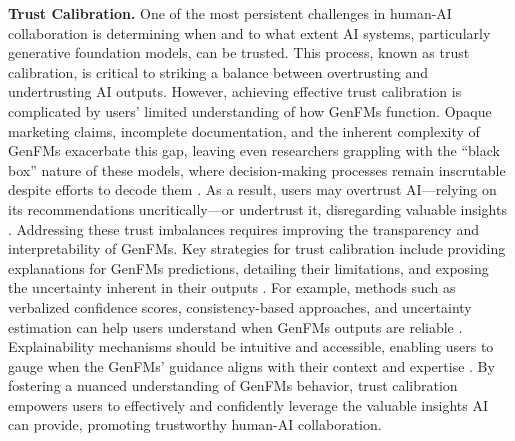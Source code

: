 \textbf{Trust Calibration.}
One of the most persistent challenges in human-AI collaboration is determining when and to what extent AI systems, particularly generative foundation models, can be trusted. This process, known as trust calibration, is critical to striking a balance between overtrusting and undertrusting AI outputs. However, achieving effective trust calibration is complicated by users' limited understanding of how GenFMs function. Opaque marketing claims, incomplete documentation, and the inherent complexity of GenFMs exacerbate this gap, leaving even researchers grappling with the ``black box'' nature of these models, where decision-making processes remain inscrutable despite efforts to decode them \cite{chen2024inside, bhardwaj-etal-2024-language, slobodkin-etal-2023-curious}. As a result, users may overtrust AI—relying on its recommendations uncritically—or undertrust it, disregarding valuable insights \cite{bs14080671, 10.1145/3544548.3581025, Elshan2022}. Addressing these trust imbalances requires improving the transparency and interpretability of GenFMs. Key strategies for trust calibration include providing explanations for GenFMs predictions, detailing their limitations, and exposing the uncertainty inherent in their outputs \cite{cheng2024can, shi-etal-2024-safer, brahman2024the, zhang2024rtuninginstructinglargelanguage}. For example, methods such as verbalized confidence scores, consistency-based approaches, and uncertainty estimation can help users understand when GenFMs outputs are reliable \cite{lin2022teaching, tian-etal-2023-just, zhao-etal-2024-knowing, wang2023selfconsistency}. Explainability mechanisms should be intuitive and accessible, enabling users to gauge when the GenFMs' guidance aligns with their context and expertise \cite{Mitchell_2019, 10.1145/3637396}. By fostering a nuanced understanding of GenFMs behavior, trust calibration empowers users to effectively and confidently leverage the valuable insights AI can provide, promoting trustworthy human-AI collaboration.

